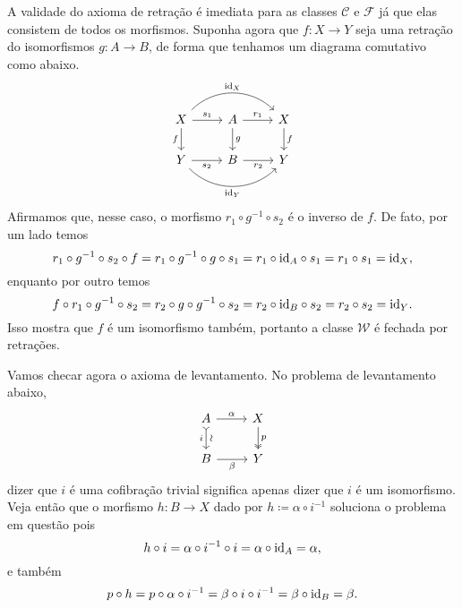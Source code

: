 \begin{exem}
  A validade do axioma de retração é imediata para as classes $\mathcal{C}$ e $\mathcal{F}$ já que elas consistem de todos os morfismos.
  Suponha agora que $f: X \to Y$ seja uma retração do isomorfismos $g: A \to B$, de forma que tenhamos um diagrama comutativo como abaixo.
  \begin{displaymath}
    \begin{tikzcd}
      X
      \arrow[r, "s_{1}"]
      \arrow[d, "f" swap]
      \arrow[rr, bend left=45, "\id_{X}"]
      & A
      \arrow[r, "r_{1}"]
      \arrow[d, "g"]
      & X
      \arrow[d, "f"]
      \\ Y
      \arrow[r, "s_{2}" swap]
      \arrow[rr, bend right=45, "\id_{Y}" swap] 
      & B
      \arrow[r, "r_{2}" swap]
      & Y
    \end{tikzcd}
  \end{displaymath}
  Afirmamos que, nesse caso, o morfismo $r_{1} \circ g^{-1} \circ s_{2}$ é o inverso de $f$.
  De fato, por um lado temos
  \begin{displaymath}
    r_{1} \circ g^{-1} \circ s_{2} \circ f = r_{1} \circ g^{-1} \circ g \circ s_{1} = r_{1} \circ \mathrm{id}_{A} \circ s_{1} = r_{1} \circ s_{1} = \mathrm{id}_{X},
  \end{displaymath}
  enquanto por outro temos
  \begin{displaymath}
    f \circ r_{1} \circ g^{-1} \circ s_{2}
    = r_{2} \circ g \circ g^{-1} \circ s_{2}
    = r_{2} \circ \mathrm{id}_{B} \circ s_{2}
    = r_{2} \circ s_{2}
    = \mathrm{id}_{Y}.
  \end{displaymath}
  Isso mostra que $f$ é um isomorfismo também, portanto a classe $\mathcal{W}$ é fechada por retrações.

  Vamos checar agora o axioma de levantamento.
  No problema de levantamento abaixo,
  \begin{displaymath}
    \begin{tikzcd}
      A
      \arrow[r, "\alpha"]
      \arrow[d, tail, "i" {swap}, "\sim" {sloped}]
      & X
      \arrow[d, two heads, "p"]
      \\ B
      \arrow[r, "\beta" swap]
      & Y
    \end{tikzcd}
  \end{displaymath}
  dizer que $i$ é uma cofibração trivial significa apenas dizer que $i$ é um isomorfismo.
  Veja então que o morfismo $h: B \to X$ dado por $h \coloneqq \alpha \circ i^{-1}$ soluciona o problema em questão pois
  \begin{displaymath}
    h \circ i = \alpha \circ i^{-1} \circ i = \alpha \circ \mathrm{id}_{A} = \alpha,
  \end{displaymath}
  e também
  \begin{displaymath}
    p \circ h = p \circ \alpha \circ i^{-1} = \beta \circ i \circ i^{-1} = \beta \circ \mathrm{id}_{B} = \beta.
  \end{displaymath}


\end{exem}

